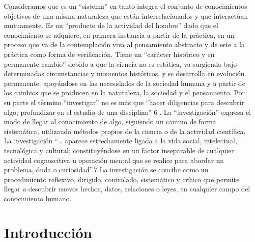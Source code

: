 \documentclass[12pt,]{krantz}
\theoremstyle{definition}
\theoremstyle{definition}
\theoremstyle{definition}
\theoremstyle{remark}
\begin{document}
Consideramos que es un ``sistema'' en tanto integra el conjunto de
conocimientos
objetivos
de
una
misma
naturaleza
que
están
interrelacionados y que interactúan mutuamente.
Es un ``producto de la actividad del hombre'' dado que el conocimiento
se adquiere, en primera instancia a partir de la práctica, en un proceso que
va de la contemplación viva al pensamiento abstracto y de este a la práctica
como forma de verificación.
Tiene un ``carácter histórico y en permanente cambio'' debido a que la
ciencia no es estática, va surgiendo bajo determinadas circunstancias y
momentos históricos, y se desarrolla en evolución permanente, apoyándose
en las necesidades de la sociedad humana y a partir de los cambios que se
producen en la naturaleza, la sociedad y el pensamiento.
Por su parte el término ``investigar'' no es más que ``hacer diligencias para
descubrir algo; profundizar en el estudio de una disciplina'' 6
.
La ``investigación''
expresa el modo de llegar al conocimiento de algo,
siguiendo un camino de forma sistemática, utilizando métodos propios de la
ciencia o de la actividad científica. La investigación ``\ldots{} aparece estrechamente
ligada a la vida social, intelectual, tecnológica y cultural; constituyéndose en un
factor inseparable de cualquier actividad cognoscitiva u operación mental que se
realice para abordar un problema, duda o curiosidad''.7
La investigación se concibe como un procedimiento reflexivo, dirigido,
controlado, sistemático y crítico que permite llegar a descubrir nuevos
hechos, datos, relaciones o leyes, en cualquier campo del conocimiento
humano.

\hypertarget{introducciuxf3n}{%
\chapter*{Introducción}\label{introducciuxf3n}}
\end{document}
